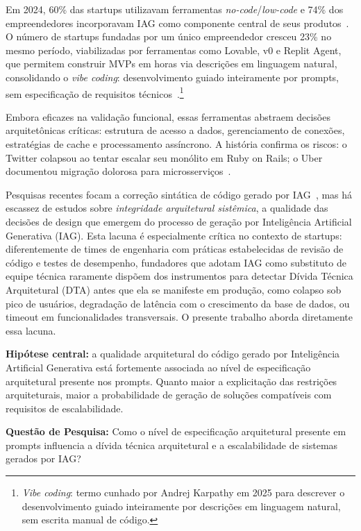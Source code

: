 \documentclass[sigconf]{acmart}
\begin{document}
Em 2024, 60\% das startups utilizavam ferramentas \textit{no-code}/\textit{low-code}
e 74\% dos empreendedores incorporavam IAG como componente central de seus
produtos~\cite{RudysAI2024,HubSpot2024}. O número de startups fundadas por um único
empreendedor cresceu 23\% no mesmo período, viabilizadas por ferramentas como Lovable,
v0 e Replit Agent, que permitem construir MVPs em horas via descrições em linguagem
natural, consolidando o \textit{vibe coding}: desenvolvimento guiado inteiramente
por prompts, sem especificação de requisitos técnicos~\cite{HubSpot2024}.\footnote{\textit{Vibe coding}: termo cunhado por Andrej Karpathy em 2025 para descrever o desenvolvimento guiado inteiramente por descrições em linguagem natural, sem escrita manual de código.}

Embora eficazes na validação funcional, essas ferramentas abstraem decisões
arquitetônicas críticas: estrutura de acesso a dados, gerenciamento de conexões,
estratégias de cache e processamento assíncrono. A história confirma os riscos:
o Twitter colapsou ao tentar escalar seu monólito em Ruby on Rails; o Uber documentou
migração dolorosa para microsserviços~\cite{Newman2021}.

Pesquisas recentes focam a correção sintática de código gerado por
IAG~\cite{Perry2023,Liu2023,Shypula2023}, mas há escassez de estudos sobre
\textit{integridade arquitetural sistêmica}, a qualidade das decisões de design
que emergem do processo de geração por Inteligência Artificial Generativa (IAG). Esta lacuna é especialmente crítica no
contexto de startups: diferentemente de times de engenharia com práticas estabelecidas
de revisão de código e testes de desempenho, fundadores que adotam IAG como substituto
de equipe técnica raramente dispõem dos instrumentos para detectar Dívida Técnica Arquitetural (DTA) antes que ela
se manifeste em produção, como colapso sob pico de usuários, degradação de
latência com o crescimento da base de dados, ou timeout em funcionalidades
transversais. O presente trabalho aborda diretamente essa lacuna.

\textbf{Hipótese central:} a qualidade arquitetural do código gerado por Inteligência
Artificial Generativa está fortemente associada ao nível de especificação arquitetural
presente nos prompts. Quanto maior a explicitação das restrições arquiteturais, maior
a probabilidade de geração de soluções compatíveis com requisitos de escalabilidade.

\textbf{Questão de Pesquisa:} Como o nível de especificação arquitetural presente em
prompts influencia a dívida técnica arquitetural e a escalabilidade de sistemas
gerados por IAG?
\end{document}
